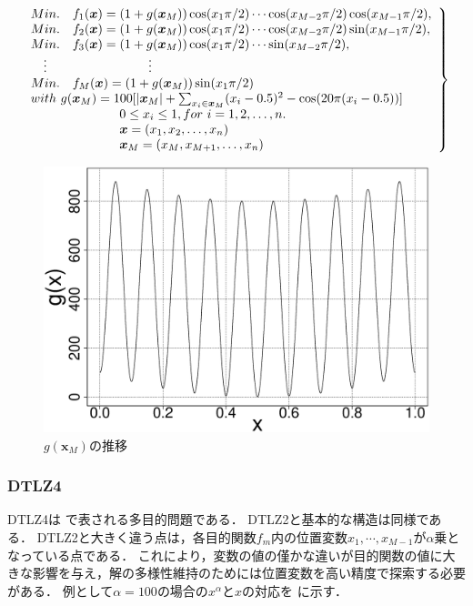 \documentclass[../main/main]{subfiles}
\begin{document}
\begin{eqnarray} 
\left.
\begin{array}{ll}
Min. \quad f_{1}  (\bm{x}) = (1+g(\bm{x}_{M}))\cos(x_{1}\pi/2)  \cdots  \cos(x_{M-2}\pi/2)\cos(x_{M-1}\pi/2),\\
Min. \quad f_{2} (\bm{x}) = (1+g(\bm{x}_{M}))\cos(x_{1}\pi/2)  \cdots  \cos(x_{M-2}\pi/2)\sin(x_{M-1}\pi/2), \\
Min. \quad f_{3} (\bm{x}) = (1+g(\bm{x}_{M}))\cos(x_{1}\pi/2)  \cdots  \sin(x_{M-2}\pi/2), \\
     \  \  \ $\vdots$    \qquad     \qquad      \qquad     \qquad \vdots \\
Min. \quad f_{M}(\bm{x}) = (1+g(\bm{x}_{M}))\sin(x_{1}\pi/2)\\
with\ g(\bm{x}_{M}) = 100[|\bm{x}_{M}| 
 +\sum_{x_i \in \bm{x}_M} (x_i - 0.5)^2  - \cos(20\pi(x_i-0.5)) ] \\
   \qquad    \qquad   \qquad  \quad  0 \le x_{i} \le 1,  for\ i = 1, 2, \ldots, n. \\
      \qquad    \qquad    \qquad  \quad        \bm x = (x_1,x_2, \ldots, x_n)\\
   \qquad    \qquad    \qquad  \quad        \bm{x}_M = (x_M,x_{M+1}, \ldots, x_n)
   \label{dtlz3} 
\end{array}
\right\}
\end{eqnarray}

\begin{figure}[htbp]
\begin{center}
\includegraphics[width=0.65\linewidth]{../figures/DTLZ3_gx.eps}
\end{center}
\setlength{\abovecaptionskip}{-8mm}
\setlength{\belowcaptionskip}{0mm}
\caption{$g(\bm{x}_M)$の推移}
\label{fig:dtlz3_gx}
\end{figure}

\clearpage
\subsubsection{DTLZ4}
DTLZ4は    で表される多目的問題である．
DTLZ2と基本的な構造は同様である．
DTLZ2と大きく違う点は，各目的関数$f_m$内の位置変数$x_1,\cdots,x_{M-1}$が$\alpha$乗となっている点である．
これにより，変数の値の僅かな違いが目的関数の値に大きな影響を与え，解の多様性維持のためには位置変数を高い精度で探索する必要がある．
例として$\alpha=100$の場合の$x^\alpha$と$x$の対応を に示す．
\end{document}

